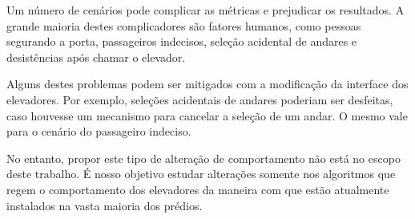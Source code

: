 Um número de cenários pode complicar as métricas e prejudicar os resultados. A grande maioria destes complicadores são fatores humanos, como pessoas segurando a porta, passageiros indecisos, seleção acidental de andares e desistências após chamar o elevador.

Alguns destes problemas podem ser mitigados com a modificação da interface dos elevadores. Por exemplo, seleções acidentais de andares poderiam ser desfeitas, caso houvesse um mecanismo para cancelar a seleção de um andar. O mesmo vale para o cenário do passageiro indeciso.

No entanto, propor este tipo de alteração de comportamento não está no escopo deste trabalho. É nosso objetivo estudar alterações somente nos algoritmos que regem o comportamento dos elevadores da maneira com que estão atualmente instalados na vasta maioria dos prédios.